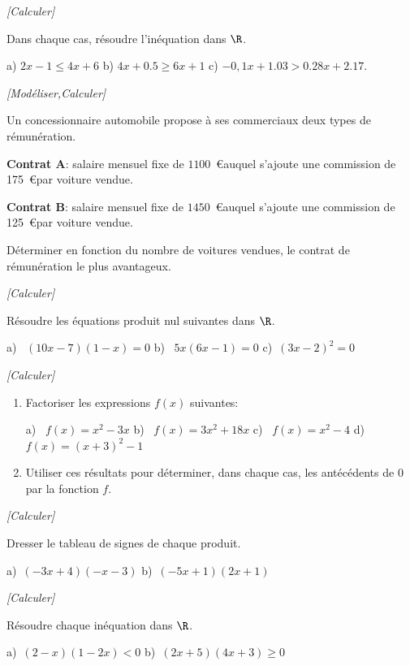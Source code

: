 \exo \textit{[Calculer]}

Dans chaque cas, résoudre l'inéquation dans $\R$.

a) $2x-1\leqslant 4x+6$ \hspace{0.8 cm} b) $4x+0.5 \geqslant 6x+1$ \hspace{0.8 cm} c) $-0,1x+1.03 > 0.28x+2.17$.

\exo \textit{[Modéliser,Calculer]}

Un concessionnaire automobile propose à ses commerciaux deux types de rémunération.

\textbf{Contrat A}: salaire mensuel fixe de $1 100$~\euro auquel s'ajoute une commission de 175~\euro par voiture vendue.

\textbf{Contrat B}: salaire mensuel fixe de $1 450$~\euro auquel s'ajoute une commission de 125~\euro par voiture vendue.

Déterminer en fonction du nombre de voitures vendues, le contrat de rémunération le plus avantageux.

\exo \textit{[Calculer]}

Résoudre les équations produit nul suivantes dans $\R$.
 
a)~ $(10x-7)(1-x)=0$ \hspace{0.5cm} b)~ $5x(6x-1)=0$ \hspace{0.5cm} c)~$(3x-2)^2=0$


\medskip

\exo \textit{[Calculer]}

\begin{enumerate}
\item Factoriser les expressions $f(x)$ suivantes:


a)~ $f(x)=x^2-3x$ \hspace{0.5cm} b)~ $f(x)=3x^2+18x$ \hspace{0.5cm} c)~ $f(x)=x^2-4$ \hspace{0.5cm} d)~ $f(x)=(x+3)^2-1$

\item Utiliser ces résultats pour déterminer, dans chaque cas, les antécédents de 0 par la fonction $f$.

\end{enumerate}

\medskip

\exo \textit{[Calculer]}

Dresser le tableau de signes de chaque produit.

a)~$(-3x+4)(-x-3)$ \hspace{0,5cm} b)~$(-5x+1)(2x+1)$

\exo \textit{[Calculer]}

Résoudre chaque inéquation dans $\R$.

a)~$(2-x)(1-2x)<0$ \hspace{0,5cm} b)~$(2x+5)(4x+3)\geqslant 0$


